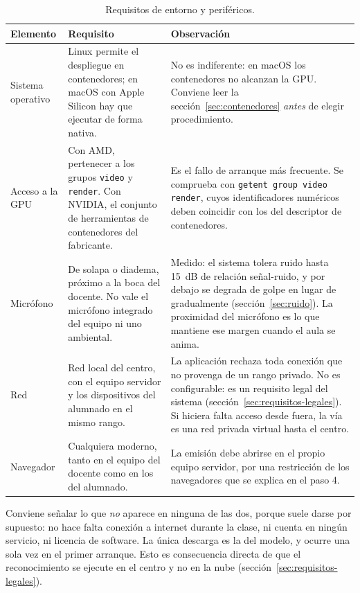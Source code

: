 \begin{table}[!ht]
\centering
\footnotesize
\setlength{\tabcolsep}{4pt}
\begin{tabular}{|p{2.5cm}|p{3.3cm}|p{6.2cm}|}
\hline
\textbf{Elemento} & \textbf{Requisito} & \textbf{Observación} \\
\hline
Sistema operativo &
    Linux permite el despliegue en contenedores; en macOS con Apple Silicon hay que
    ejecutar de forma nativa. &
    No es indiferente: en macOS los contenedores no alcanzan la GPU. Conviene leer la
    sección~\ref{sec:contenedores} \emph{antes} de elegir procedimiento. \\
\hline
Acceso a la GPU &
    Con AMD, pertenecer a los grupos \texttt{video} y \texttt{render}. Con NVIDIA, el
    conjunto de herramientas de contenedores del fabricante. &
    Es el fallo de arranque más frecuente. Se comprueba con
    \texttt{getent group video render}, cuyos identificadores numéricos deben coincidir con
    los del descriptor de contenedores. \\
\hline
Micrófono &
    De solapa o diadema, próximo a la boca del docente. No vale el micrófono integrado del
    equipo ni uno ambiental. &
    Medido: el sistema tolera ruido hasta 15~dB de relación señal-ruido, y por debajo se
    degrada de golpe en lugar de gradualmente (sección~\ref{sec:ruido}). La proximidad del
    micrófono es lo que mantiene ese margen cuando el aula se anima. \\
\hline
Red &
    Red local del centro, con el equipo servidor y los dispositivos del alumnado en el
    mismo rango. &
    La aplicación rechaza toda conexión que no provenga de un rango privado. No es
    configurable: es un requisito legal del sistema
    (sección~\ref{sec:requisitos-legales}). Si hiciera falta acceso desde fuera, la vía es
    una red privada virtual hasta el centro. \\
\hline
Navegador &
    Cualquiera moderno, tanto en el equipo del docente como en los del alumnado. &
    La emisión debe abrirse en el propio equipo servidor, por una restricción de los
    navegadores que se explica en el paso 4. \\
\hline
\end{tabular}
\caption{Requisitos de entorno y periféricos.}
\label{tab:requisitos-entorno}
\end{table}

Conviene señalar lo que \emph{no} aparece en ninguna de las dos, porque suele darse por supuesto: no
hace falta conexión a internet durante la clase, ni cuenta en ningún servicio, ni licencia de
software. La única descarga es la del modelo, y ocurre una sola vez en el primer arranque.
Esto es consecuencia directa de que el reconocimiento se ejecute en el centro y no en la nube
(sección~\ref{sec:requisitos-legales}).

